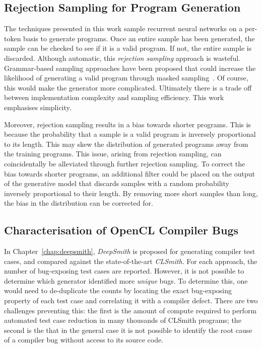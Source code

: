 \subsection{Rejection Sampling for Program Generation}

The techniques presented in this work sample recurrent neural networks on a per-token basis to generate programs. Once an entire sample has been generated, the sample can be checked to see if it is a valid program. If not, the entire sample is discarded. Although automatic, this \emph{rejection sampling} approach is wasteful. Grammar-based sampling approaches have been proposed that could increase the likelihood of generating a valid program through masked sampling~\cite{Dyer2016}. Of course, this would make the generator more complicated. Ultimately there is a trade off between implementation complexity and sampling efficiency. This work emphasises simplicity.

Moreover, rejection sampling results in a bias towards shorter programs. This is because the probability that a sample is a valid program is inversely proportional to its length. This may skew the distribution of generated programs away from the training programs. This issue, arising from rejection sampling, can coincidentally be alleviated through further rejection sampling. To correct the bias towards shorter programs, an additional filter could be placed on the output of the generative model that discards samples with a random probability inversely proportional to their length. By removing more short samples than long, the bias in the distribution can be corrected for.


\subsection{Characterisation of OpenCL Compiler Bugs}

In Chapter~\ref{chap:deepsmith}, \emph{DeepSmith} is proposed for generating compiler test cases, and compared against the state-of-the-art \emph{CLSmith}. For each approach, the number of bug-exposing test cases are reported. However, it is not possible to determine which generator identified more \emph{unique} bugs. To determine this, one would need to de-duplicate the counts by locating the exact bug-exposing property of each test case and correlating it with a compiler defect. There are two challenges preventing this: the first is the amount of compute required to perform automated test case reduction in many thousands of CLSmith programs; the second is the that in the general case it is not possible to identify the root cause of a compiler bug without access to its source code.

